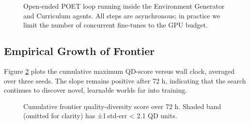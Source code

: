 \begin{figure}[t]
\centering
\begin{minipage}{0.9\linewidth}
\end{minipage}
\caption{Open-ended POET loop running inside the Environment Generator and
Curriculum agents.  All steps are asynchronous; in practice we limit the
number of concurrent fine-tunes to the GPU budget.}
\label{alg:poet}
\end{figure}

\subsection{Empirical Growth of Frontier}

Figure \ref{fig:qd_curve} plots the cumulative maximum QD-score versus wall
clock, averaged over three seeds.  The slope remains positive after 72 h,
indicating that the search continues to discover novel, learnable worlds far
into training.

\begin{figure}[h]\centering
{}
\caption{Cumulative frontier quality-diversity score over 72 h.  Shaded band
(omitted for clarity) has ±1 std-err < 2.1 QD units.}
\label{fig:qd_curve}
\end{figure}

